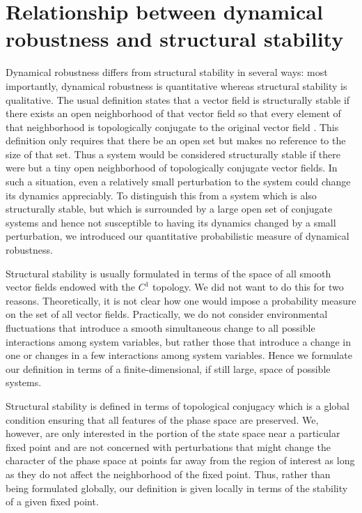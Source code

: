 \section{Relationship between dynamical robustness and structural stability}\label{sec:dynrobustandstructstab}

Dynamical robustness differs from structural stability in several ways: most importantly, dynamical robustness is quantitative whereas structural stability is qualitative.  The usual definition states that a vector field is structurally stable if there exists an open neighborhood of that vector field so that every element of that neighborhood is topologically conjugate to the original vector field \cite{Smale1967}.  This definition only requires that there be an open set but makes no reference to the size of that set.  Thus a system would be considered structurally stable if there were but a tiny open neighborhood of topologically conjugate vector fields.  In such a situation, even a relatively small perturbation to the system could change its dynamics appreciably.  To distinguish this from a system which is also structurally stable, but which is surrounded by a large open set of conjugate systems and hence not susceptible to having its dynamics changed by a small perturbation, we introduced our quantitative probabilistic measure of dynamical robustness.

Structural stability is usually formulated in terms of the space of all smooth vector fields endowed with the $C^1$ topology.  We did not want to do this for two reasons.  Theoretically, it is not clear how one would impose a probability measure on the set of all vector fields.  Practically, we do not consider environmental fluctuations that introduce a smooth simultaneous change to all possible interactions among system variables, but rather those that introduce a change in one or changes in a few interactions among system variables.  Hence we formulate our definition in terms of a finite-dimensional, if still large, space of possible systems.

Structural stability is defined in terms of topological conjugacy which is a global condition ensuring that all features of the phase space are preserved.  We, however, are only interested in the portion of the state space near a particular fixed point and are not concerned with perturbations that might change the character of the phase space at points far away from the region of interest as long as they do not affect the neighborhood of the fixed point.  Thus, rather than being formulated globally, our definition is given locally in terms of the stability of a given fixed point.
